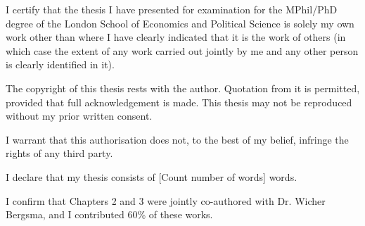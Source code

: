 I certify that the thesis I have presented for examination for the MPhil/PhD degree of the London School of Economics and Political Science is solely my own work other than where I have clearly indicated that it is the work of others (in which case the extent of any work carried out jointly by me and any other person is clearly identified in it).

The copyright of this thesis rests with the author. Quotation from it is permitted, provided that full acknowledgement is made. This thesis may not be reproduced without my prior written consent.

I warrant that this authorisation does not, to the best of my belief, infringe the rights of any third party.

I declare that my thesis consists of [Count number of words] words.

I confirm that Chapters 2 and 3 were jointly co-authored with Dr. Wicher Bergsma, and I contributed 60\% of these works.
